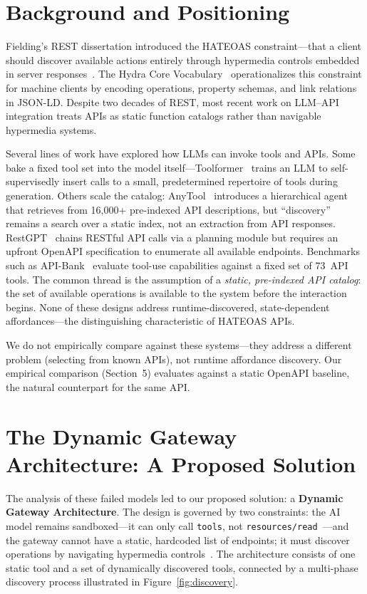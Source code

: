 \documentclass[11pt,a4paper]{article}
\begin{document}
\section{Background and Positioning}

Fielding's REST dissertation introduced the HATEOAS constraint---that a client should discover available actions entirely through hypermedia controls embedded in server responses~\cite{fielding2000}. The Hydra Core Vocabulary~\cite{hydra} operationalizes this constraint for machine clients by encoding operations, property schemas, and link relations in JSON-LD. Despite two decades of REST, most recent work on LLM--API integration treats APIs as static function catalogs rather than navigable hypermedia systems.

Several lines of work have explored how LLMs can invoke tools and APIs. Some bake a fixed tool set into the model itself---Toolformer~\cite{schick2023toolformer} trains an LLM to self-supervisedly insert calls to a small, predetermined repertoire of tools during generation. Others scale the catalog: AnyTool~\cite{du2024anytool} introduces a hierarchical agent that retrieves from 16,000+ pre-indexed API descriptions, but ``discovery'' remains a search over a static index, not an extraction from API responses. RestGPT~\cite{song2023restgpt} chains RESTful API calls via a planning module but requires an upfront OpenAPI specification to enumerate all available endpoints. Benchmarks such as API-Bank~\cite{li2023apibank} evaluate tool-use capabilities against a fixed set of 73~API tools. The common thread is the assumption of a \emph{static, pre-indexed API catalog}: the set of available operations is available to the system before the interaction begins. None of these designs address runtime-discovered, state-dependent affordances---the distinguishing characteristic of HATEOAS APIs.

We do not empirically compare against these systems---they address a different problem (selecting from known APIs), not runtime affordance discovery. Our empirical comparison (Section~5) evaluates against a static OpenAPI baseline, the natural counterpart for the same API.

\section{The Dynamic Gateway Architecture: A Proposed Solution}

The analysis of these failed models led to our proposed solution: a \textbf{Dynamic Gateway Architecture}. The design is governed by two constraints: the AI model remains sandboxed---it can only call \texttt{tools}, not \texttt{resources/read}~\cite{mcp-tools}---and the gateway cannot have a static, hardcoded list of endpoints; it must discover operations by navigating hypermedia controls~\cite{hydra}. The architecture consists of one static tool and a set of dynamically discovered tools, connected by a multi-phase discovery process illustrated in Figure~\ref{fig:discovery}.
\end{document}
